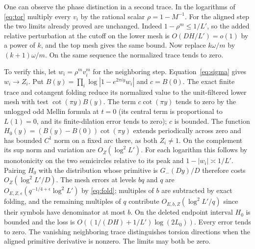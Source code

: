 \documentclass[11pt]{article}
\begin{document}
One can observe the phase distinction in a second trace. In the
logarithms of \eqref{eq:tor} multiply every $v_i$ by the rational
scalar $\rho=1-M^{-1}$. For the aligned step the two limits already
proved are unchanged. Indeed $1-\rho^m\le1/L'$, so the added relative
perturbation at the cutoff on the lower mesh is $O(DH/L')=o(1)$
by a power of $k$, and the top mesh gives the same bound. Now replace
$k\omega/m$ by $(k+1)\omega/m$. On the same sequence the normalized
trace tends to zero.

To verify this, let $w_i=\rho^m v_i^m$ for the neighboring step.
Equation~\eqref{eq:sigma} gives $w_i\to Z_i$. Put
$B(y)=\prod_i\log|1-e^{2\pi iy}w_i|$ and $c=B(0)$.
The exact finite trace and cotangent folding reduce its normalized
value to the unit-filtered lower mesh with test $\cot(\pi y)B(y)$.
The term $c\cot(\pi y)$ tends to zero by the unlogged odd Mellin
formula at $t=0$ (its central term is proportional to $L(1)=0$,
and its finite-dilation error tends to zero); $c$ is bounded.
The function
$H_0(y)=(B(y)-B(0))\cot(\pi y)$ extends periodically across zero
and has bounded $C^1$ norm on a fixed arc there, as both $Z_i\ne1$.
On the complement its sup norm and variation are
$O_Z(\log^2 L')$. For each logarithm this follows by monotonicity
on the two semicircles relative to its peak and
$1-|w_i|\asymp1/L'$. Pairing $H_0$ with the distribution whose
primitive is $G_-(Dy)/D$ therefore costs $O_Z(\log^2 L'/D)$.
The mesh errors at levels $bq$ and $q$ are
$O_{E,Z,\epsilon}(q^{-1/4+\epsilon}\log^2L')$ by
\eqref{eq:fold}; multiples of $b$ are subtracted by exact folding,
and the remaining multiples of $q$ contribute
$O_{E,b,Z}(\log^2 L'/q)$ since their symbols have denominator at
most $b$. On the deleted endpoint interval $H_0$ is bounded and
the loss is $O((1/(DH)+1/L')\log(2L_0))$. Every error tends to zero.
The vanishing neighboring trace distinguishes torsion directions
when the aligned primitive derivative is nonzero. The limits may
both be zero.
\end{document}
